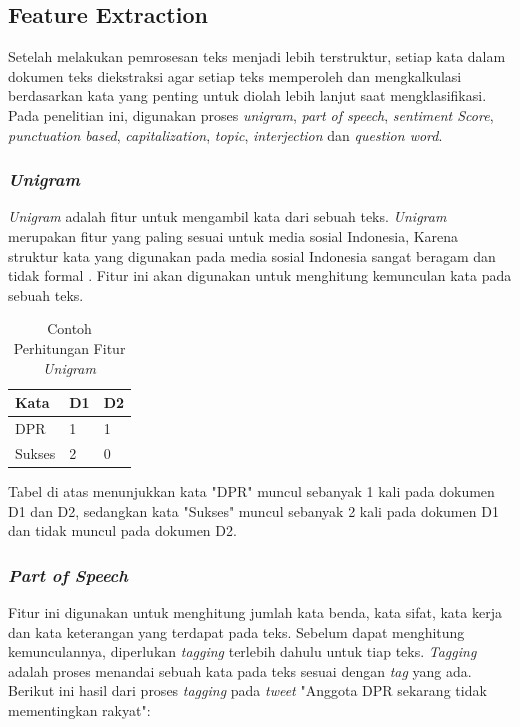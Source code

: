 \subsection{Feature Extraction}
Setelah melakukan pemrosesan teks menjadi lebih terstruktur, setiap kata dalam dokumen teks diekstraksi agar setiap teks memperoleh dan mengkalkulasi berdasarkan kata yang penting untuk diolah lebih lanjut saat mengklasifikasi. Pada penelitian ini, digunakan proses \textit{unigram}, \textit{part of speech}, \textit{sentiment Score}, \textit{punctuation based}, \textit{capitalization}, \textit{topic}, \textit{interjection} dan \textit{question word}.

\subsubsection{\textit{Unigram}}
\textit{Unigram} adalah fitur untuk mengambil kata dari sebuah teks. \textit{Unigram} merupakan fitur yang paling sesuai untuk media sosial Indonesia, Karena struktur kata yang digunakan pada media sosial Indonesia sangat beragam dan tidak formal \cite{5}. Fitur ini akan digunakan untuk menghitung kemunculan kata pada sebuah teks.

\begin{table}[H]
	\caption{Contoh Perhitungan Fitur \textit{Unigram}}
	\centering
	\small
	\begin{adjustbox}{width=1\textwidth}
	\begin{tabular}{|p{4.6cm}|p{4cm}|p{4cm}|}
		\hline
		\textbf{Kata} & \textbf{D1} & \textbf{D2} \\
		\hline
		DPR & 1 & 1 \\
		\hline
		Sukses & 2 & 0 \\
		\hline
	\end{tabular}
	\end{adjustbox}
\end{table}
Tabel di atas menunjukkan kata "DPR" muncul sebanyak 1 kali pada dokumen D1 dan D2, sedangkan kata "Sukses" muncul sebanyak 2 kali pada dokumen D1 dan tidak muncul pada dokumen D2.

\subsubsection{\textit{Part of Speech}}
Fitur ini digunakan untuk menghitung jumlah kata benda, kata sifat, kata kerja dan kata keterangan yang terdapat pada teks. Sebelum dapat menghitung kemunculannya, diperlukan \textit{tagging} terlebih dahulu untuk tiap teks. \textit{Tagging} adalah proses menandai sebuah kata pada teks sesuai dengan \textit{tag} yang ada. Berikut ini hasil dari proses \textit{tagging} pada \textit{tweet} "Anggota DPR sekarang 
tidak mementingkan rakyat": 

